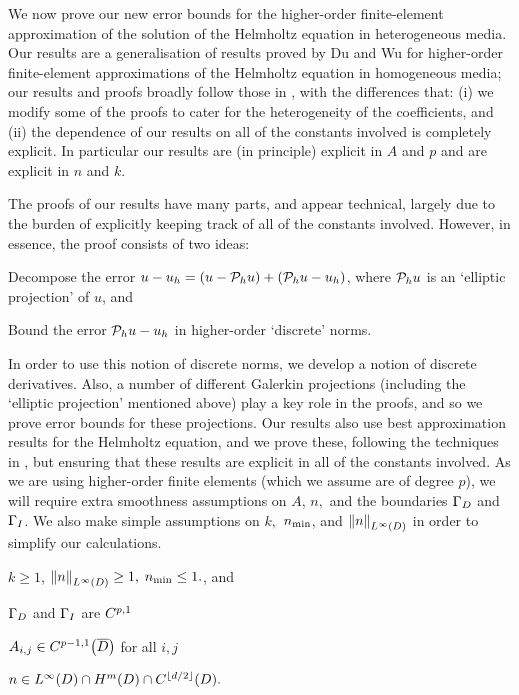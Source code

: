 We now prove our new error bounds for the higher-order finite-element approximation of the solution of the Helmholtz equation in heterogeneous media. Our results are a generalisation of results proved by Du and Wu \cite{DuWu:15} for higher-order finite-element approximations of the Helmholtz equation in homogeneous media; our results and proofs broadly follow those in \cite{DuWu:15}, with the differences that: (i) we modify some of the proofs to cater for the heterogeneity of the coefficients, and (ii) the dependence of our results on all of the constants involved is completely explicit. In particular our results are (in principle) explicit in $A$  and $p$ and are explicit in $n$ and $k$.

The proofs of our results have many parts, and appear technical, largely due to the burden of explicitly keeping track of all of the constants involved. However, in essence, the proof consists of two ideas:
\ben
\item Decompose the error $u-u_{h} = (u - \mathcal P_{h} u) + (\mathcal P_{h} u - u_{h})$, where $\mathcal P_{h} u$ is an `elliptic projection' of $u$, and
\item Bound the error $\mathcal P_{h} u - u_{h}$ in higher-order `discrete' norms.
\een

In order to use this notion of discrete norms, we develop a notion of discrete derivatives. Also, a number of different Galerkin projections (including the `elliptic projection' mentioned above) play a key role in the proofs, and so we prove error bounds for these projections. Our results also use best approximation results for the Helmholtz equation, and we prove these, following the techniques in \cite{ChNi:18a}, but ensuring that these results are explicit in all of the constants involved.
As we are using higher-order finite elements (which we assume are of degree $p$), we will require extra smoothness assumptions on $A$, $n,$ and the boundaries $\Gamma_{D}$ and $\Gamma_{I}$. We also make simple assumptions on $k,$ $n_{\min}$, and $\NLiD{n}$ in order to simplify our calculations.

\label{ass:highp}
$k \geq 1$, $\NLiD{n} \geq 1,$ $n_{\min} \leq 1.$, and
\bit
\item $\Gamma_{D}$ and $\Gamma_{I}$ are $C^{p,1}$
\item $\Aij \in \CpmooDclos$ for all $i,j$
\item $n \in \LiD \cap \HmD \cap \CfloordtD.$
  \eit
\eas

